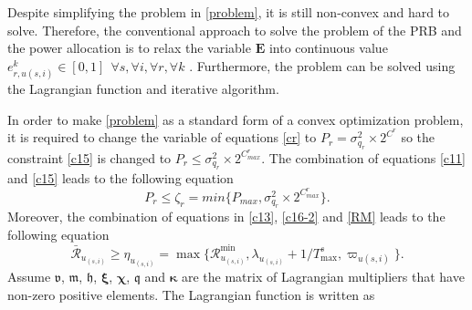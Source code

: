 \documentclass[lettersize,journal]{IEEEtran}
\begin{document}
Despite simplifying the problem in \eqref{problem}, it is still non-convex and hard to solve.
Therefore, the conventional approach to solve the problem of the PRB and the power allocation is to relax the variable $\mathbf{E}$ into continuous value $e_{r,u(s,i)}^k \in [0,1] \:\: \forall s , \forall i ,\forall r, \forall k$ \cite{lee2018dynamic,ali2018joint}.
Furthermore, the problem can be solved using the Lagrangian function and iterative algorithm.

In order to make \eqref{problem} as a standard form of a convex optimization problem, it is required to change the variable of equations \eqref{cr} to $P_r = \sigma_{q_r}^2\times 2^{C^r}$ so the constraint
\eqref{c15} is changed to
 $P_r \leq \sigma_{q_r}^2\times 2^{C^r_{max}}$.
The combination of equations \eqref{c11} and \eqref{c15} leads to the following equation
\begin{equation} \label{pr11}
P_r\leq \zeta_r= min\{P_{max}, \sigma_{q_r}^2\times 2^{C^r_{max}} \}. 
\end{equation}
Moreover, the combination of equations in \eqref{c13}, \eqref{c16-2} and \eqref{RM} leads to the following equation
\begin{equation}\label{RConstr}
\mathcal{\bar{R}}_{u_{(s,i)}} \geq\eta_{u_{(s,i)}}= \max\{\mathcal{R}_{u_{(s,i)}}^{\min}, \lambda_{u_{(s,i)}}+1/T^s_{\max}, \varpi_{u(s,i)} \}. 
\end{equation}
Assume $\boldsymbol{\mathfrak{v}}$, $\boldsymbol{\mathfrak{m}}$, $\boldsymbol{\mathfrak{h}}$, $\boldsymbol{\xi}$, $\boldsymbol{\chi}$, $\boldsymbol{\mathfrak{q}}$ and $\boldsymbol{ \kappa}$ are the matrix of Lagrangian multipliers that have non-zero positive elements. The Lagrangian function is written as
\end{document}
